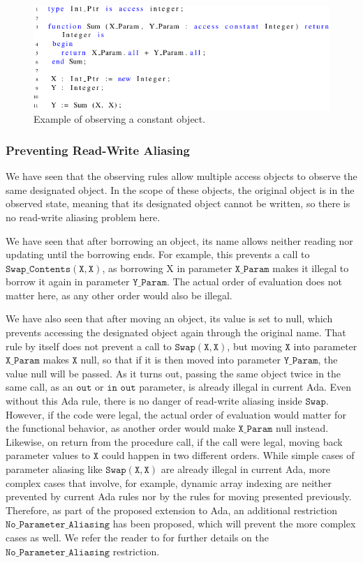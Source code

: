 \documentclass{llncs}
\newcommand\var[1]{\ensuremath{\mathtt{#1}}}
\begin{document}
\begin{figure}[htb!]
\centering
   \includegraphics[]{observe_ex1}
   \caption{Example of observing a constant object.}
   \label{fig:observe_exp}
\end{figure}

\subsubsection{Preventing Read-Write Aliasing}
\label{sec:noaliasing}

We have seen that the observing rules allow multiple access objects to observe the same designated object. In the scope of these objects, the original object is in the observed state, meaning that its designated object
cannot be written, so there is no read-write aliasing problem here.

\smallskip
We have seen that after borrowing an object, its name allows neither reading nor updating until the borrowing ends. For example, this prevents a call to \var{Swap\_Contents (X, X)},
as borrowing X in parameter \var{X\_Param} makes it illegal to borrow it again in parameter \var{Y\_Param}. The actual order of evaluation does not matter here, as any other order would also be illegal.

\smallskip
We have also seen that after moving an object, its value is set to null, which prevents accessing the designated object again through the original name.
That rule by itself does not prevent a call to \var{Swap(X, X)}, but moving \var{X} into parameter \var{X\_Param} makes \var{X} null, so that if it is then moved into parameter \var{Y\_Param}, the value null will be passed.   As it turns out, passing the same object twice in the same call, as an \var{out} or \var{in} \var{out} parameter, is already illegal in current Ada.
Even without this Ada rule, there is no danger of read-write aliasing inside \var{Swap}. However, if the code were legal, the actual order of evaluation would matter for the functional behavior, as another order would make \var{X\_Param} null
instead. Likewise, on return from the procedure call, if the call were legal, moving back parameter values to \var{X} could happen in two different orders.
While simple cases of parameter aliasing like \var{Swap(X,X)} are already illegal in current Ada, more complex cases that involve, for example, dynamic array indexing are neither
prevented by current Ada rules nor by the rules for moving presented previously. Therefore, as part of the proposed
extension to Ada, an additional restriction \var{No\_Parameter\_Aliasing} has been proposed,
which will prevent the more complex cases as well. We refer the reader to \cite{AI2018} for further details on the \var{No\_Parameter\_Aliasing} restriction.
\end{document}
